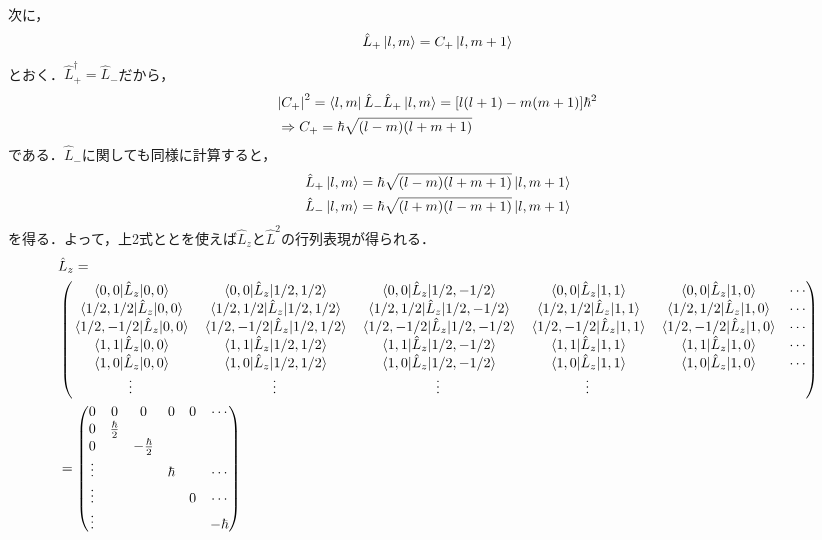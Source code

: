 \documentclass{report}
\begin{document}
次に，
\begin{align}
  \hat{L}_{+}\ket{l,m} = C_{+}\ket{l,m+1}
\end{align}
とおく．$\hat{L}_{+}^{\dagger} = \hat{L}_{-}$だから，
\begin{align}
  &\abs{C_{+}}^2 = \bra{l,m}\hat{L}_{-}\hat{L}_{+}\ket{l,m} = \qty[l(l+1) -m(m+1)]\hbar^2\\
  &\Rightarrow C_{+} = \hbar\sqrt{(l-m)(l+m+1)}
\end{align}
である．$\hat{L}_{-}$に関しても同様に計算すると，
\begin{align}
  \hat{L}_{+}\ket{l,m} = \hbar\sqrt{(l-m)(l+m+1)}\ket{l,m+1}\\
  \hat{L}_{-}\ket{l,m} = \hbar\sqrt{(l+m)(l-m+1)}\ket{l,m+1}
\end{align}
を得る．よって，上2式ととを使えば$\hat{L}_z$と$\hat{L}^2$の行列表現が得られる．
\begin{align}
  &\hat{L}_z = \\
  &\begin{pmatrix} 
    \mel{0,0}{\hat{L}_z}{0,0} & \mel{0,0}{\hat{L}_z}{1/2,1/2} & \mel{0,0}{\hat{L}_z}{1/2,-1/2} & \mel{0,0}{\hat{L}_z}{1,1} & \mel{0,0}{\hat{L}_z}{1,0} & \cdots \\
    \mel{1/2,1/2}{\hat{L}_z}{0,0} & \mel{1/2,1/2}{\hat{L}_z}{1/2,1/2} & \mel{1/2,1/2}{\hat{L}_z}{1/2,-1/2} & \mel{1/2,1/2}{\hat{L}_z}{1,1} & \mel{1/2,1/2}{\hat{L}_z}{1,0} & \cdots \\
    \mel{1/2,-1/2}{\hat{L}_z}{0,0} & \mel{1/2,-1/2}{\hat{L}_z}{1/2,1/2} & \mel{1/2,-1/2}{\hat{L}_z}{1/2,-1/2} & \mel{1/2,-1/2}{\hat{L}_z}{1,1} & \mel{1/2,-1/2}{\hat{L}_z}{1,0} & \cdots \\
    \mel{1,1}{\hat{L}_z}{0,0} & \mel{1,1}{\hat{L}_z}{1/2,1/2} & \mel{1,1}{\hat{L}_z}{1/2,-1/2} & \mel{1,1}{\hat{L}_z}{1,1} & \mel{1,1}{\hat{L}_z}{1,0} & \cdots \\
    \mel{1,0}{\hat{L}_z}{0,0} & \mel{1,0}{\hat{L}_z}{1/2,1/2} & \mel{1,0}{\hat{L}_z}{1/2,-1/2} & \mel{1,0}{\hat{L}_z}{1,1} & \mel{1,0}{\hat{L}_z}{1,0} & \cdots \\
    \vdots & \vdots & \vdots & \vdots  
  \end{pmatrix} \\
  &=
  \begin{pmatrix}
    0 & 0 & 0 & 0 & 0 & \cdots\\
    0 & \frac{\hbar}{2} &  &  &  & \\
    0  & & -\frac{\hbar}{2} &  & & \\
    \vdots & & & \hbar & & \cdots \\
    \vdots & & & & 0 &  \cdots\\
    \vdots & & & & & -\hbar 
  \end{pmatrix}
\end{align}
\end{document}
